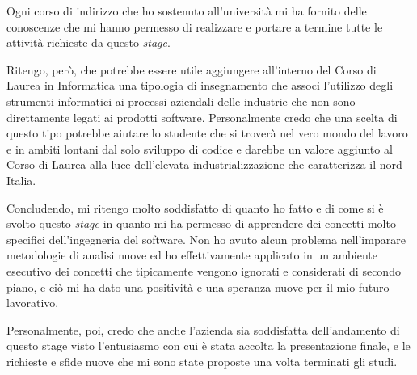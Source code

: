 Ogni corso di indirizzo che ho sostenuto all'università mi ha fornito delle conoscenze che mi hanno permesso di realizzare e portare a termine tutte le attività richieste da questo \textit{stage}. 

Ritengo, però, che potrebbe essere utile aggiungere all'interno del Corso di Laurea in Informatica una tipologia di insegnamento che associ l'utilizzo degli strumenti informatici ai processi aziendali delle industrie che non sono direttamente legati ai prodotti software. Personalmente credo che una scelta di questo tipo potrebbe aiutare lo studente che si troverà nel vero mondo del lavoro e in ambiti lontani dal solo sviluppo di codice e darebbe un valore aggiunto al Corso di Laurea alla luce dell'elevata industrializzazione che caratterizza il nord Italia.


\bigskip
Concludendo, mi ritengo molto soddisfatto di quanto ho fatto e di come si è svolto questo \textit{stage} in quanto mi ha permesso di apprendere dei concetti molto specifici dell'ingegneria del software. Non ho avuto alcun problema nell'imparare metodologie di analisi nuove ed ho effettivamente applicato in un ambiente esecutivo dei concetti che tipicamente vengono ignorati e considerati di secondo piano, e ciò mi ha dato una positività e una speranza nuove per il mio futuro lavorativo.

Personalmente, poi, credo che anche l'azienda sia soddisfatta dell'andamento di questo stage visto l'entusiasmo con cui è stata accolta la presentazione finale, e le richieste e sfide nuove che mi sono state proposte una volta terminati gli studi.

